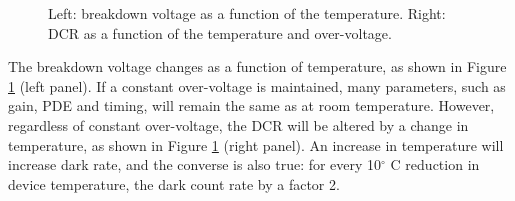 \begin{figure}[!bhtp]
	\caption{\label{fig.temp} Left: breakdown voltage as a function of the temperature. Right: DCR as a function of the temperature and over-voltage.}
\end{figure}


The breakdown voltage changes as a function of temperature, as shown in Figure \ref{fig.temp} (left panel). If a constant over-voltage is maintained, many parameters, such as gain, PDE and timing, will remain the same as at room temperature. However, regardless of constant over-voltage, the DCR will be altered by a change in temperature, as shown in Figure \ref{fig.temp} (right panel). An increase in temperature will increase dark rate, and the converse is also true: for every 10$^\circ$ C reduction in device temperature, the dark count rate by a factor 2. 

